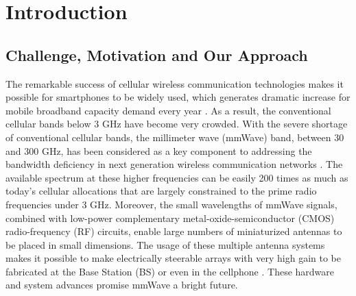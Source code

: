 \chapter{Introduction}\label{ch:Intro}
\section{Challenge, Motivation and Our Approach}
\label{sec:1}
\par The remarkable success of cellular wireless communication technologies makes it possible for smartphones to be widely used, which generates dramatic increase for mobile broadband capacity demand every year \cite{index2013global, cerwall2011ericsson, pujol2011mobile}. As a result, the conventional cellular bands below 3 GHz have become very crowded. With the severe shortage of conventional cellular bands, the millimeter wave (mmWave) band, between $30$ and $300$ GHz, has been considered as a key component to addressing the bandwidth deficiency in next generation wireless communication networks \cite{khan2011mmwave, pi2011introduction, rappaport2011state, pietraski2012millimeter, rangan2014millimeter}. The available spectrum at these higher frequencies can be easily 200 times as much as today's cellular allocations that are largely constrained to the prime radio frequencies under 3 GHz. Moreover, the small wavelengths of mmWave signals, combined with low-power complementary metal-oxide-semiconductor (CMOS) radio-frequency (RF) circuits, enable large numbers of miniaturized antennas to be placed in small dimensions. The usage of these multiple antenna systems makes it possible to make electrically steerable arrays with very high gain to be fabricated at the Base Station (BS) or even in the cellphone \cite{doan2004design, zhang2009antenna, gutierrez2009chip, rajagopal2011antenna}. These hardware and system advances promise mmWave a bright future.
